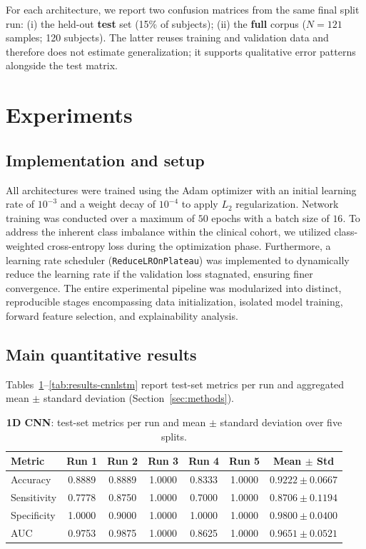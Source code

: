 \documentclass{article}
\begin{document}
For each architecture, we report two confusion matrices from the same final split run: (i) the held-out \textbf{test} set (15\% of subjects); (ii) the \textbf{full} corpus ($N{=}121$ samples; 120 subjects). The latter reuses training and validation data and therefore does not estimate generalization; it supports qualitative error patterns alongside the test matrix.

\section{Experiments}
\label{sec:experiments}

\subsection{Implementation and setup}

All architectures were trained using the Adam optimizer with an initial learning rate of $10^{-3}$ and a weight decay of $10^{-4}$ to apply $L_2$ regularization. Network training was conducted over a maximum of $50$ epochs with a batch size of $16$. To address the inherent class imbalance within the clinical cohort, we utilized class-weighted cross-entropy loss during the optimization phase. Furthermore, a learning rate scheduler (\texttt{ReduceLROnPlateau}) was implemented to dynamically reduce the learning rate if the validation loss stagnated, ensuring finer convergence. The entire experimental pipeline was modularized into distinct, reproducible stages encompassing data initialization, isolated model training, forward feature selection, and explainability analysis.

\subsection{Main quantitative results}

Tables~\ref{tab:results-cnn1d}--\ref{tab:results-cnnlstm} report test-set metrics per run and aggregated mean $\pm$ standard deviation (Section~\ref{sec:methods}).

\begin{table}[ht]
  \caption{\textbf{1D CNN}: test-set metrics per run and mean $\pm$ standard deviation over five splits.}
  \label{tab:results-cnn1d}
  \centering
  \footnotesize
  \setlength{\tabcolsep}{4pt}
  \begin{tabular}{l ccccc c}
    \toprule
    Metric & Run 1 & Run 2 & Run 3 & Run 4 & Run 5 & Mean $\pm$ Std \\
    \midrule
    Accuracy    & 0.8889 & 0.8889 & 1.0000 & 0.8333 & 1.0000 & $0.9222 \pm 0.0667$ \\
    Sensitivity & 0.7778 & 0.8750 & 1.0000 & 0.7000 & 1.0000 & $0.8706 \pm 0.1194$ \\
    Specificity & 1.0000 & 0.9000 & 1.0000 & 1.0000 & 1.0000 & $0.9800 \pm 0.0400$ \\
    AUC         & 0.9753 & 0.9875 & 1.0000 & 0.8625 & 1.0000 & $0.9651 \pm 0.0521$ \\
    \bottomrule
  \end{tabular}
\end{table}
\end{document}
